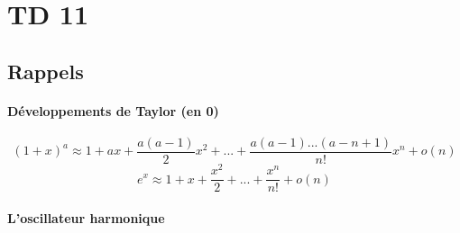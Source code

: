 \section{TD 11}



\subsection{Rappels}


\paragraph{Développements de Taylor (en 0)}
\[
	(1+x)^a\approx 1+ax+\frac{a(a-1)}{2}x^2+...+\frac{a(a-1)...(a-n+1)}{n!}x^n+o(n)
\]
\[
	e^x\approx 1+x+\frac{x^2}{2}+...+\frac{x^n}{n!}+o(n)
\]

\paragraph{L'oscillateur harmonique}


